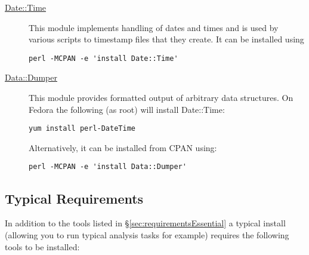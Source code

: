 \begin{description}
\item [\href{http://search.cpan.org/~drolsky/DateTime-0.70/lib/DateTime.pm}{{\normalfont \ttfamily Date::Time }}] This module implements handling of dates and times and is used by various scripts to timestamp files that they create. It can be installed using
\begin{verbatim}
perl -MCPAN -e 'install Date::Time'
\end{verbatim}

\item [\href{http://search.cpan.org/~smueller/Data-Dumper-2.131/Dumper.pm}{{\normalfont \ttfamily Data::Dumper }}] This module provides formatted output of arbitrary data structures. On Fedora the following (as root) will install {\normalfont \ttfamily Date::Time}:
\begin{verbatim}
yum install perl-DateTime
\end{verbatim}
Alternatively, it can be installed from CPAN using:
\begin{verbatim}
perl -MCPAN -e 'install Data::Dumper'
\end{verbatim}
\end{description}

\subsection{Typical Requirements}\label{sec:requirementsTypical}

In addition to the tools listed in \S\ref{sec:requirementsEssential} a typical install (allowing you to run typical analysis tasks for example) requires the following tools to be installed:

